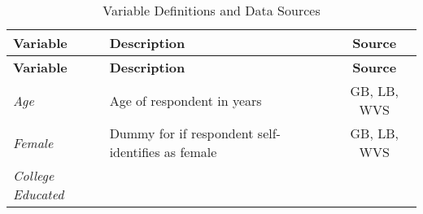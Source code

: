 \documentclass[11pt,]{article}
\begin{document}
\begin{longtable}[]{@{}llc@{}}
\caption{Variable Definitions and Data Sources}\tabularnewline
\toprule
\begin{minipage}[b]{0.19\columnwidth}\raggedright\strut
\textbf{Variable}\strut
\end{minipage} & \begin{minipage}[b]{0.46\columnwidth}\raggedright\strut
\textbf{Description}\strut
\end{minipage} & \begin{minipage}[b]{0.22\columnwidth}\centering\strut
\textbf{Source}\strut
\end{minipage}\tabularnewline
\midrule
\endfirsthead
\toprule
\begin{minipage}[b]{0.19\columnwidth}\raggedright\strut
\textbf{Variable}\strut
\end{minipage} & \begin{minipage}[b]{0.46\columnwidth}\raggedright\strut
\textbf{Description}\strut
\end{minipage} & \begin{minipage}[b]{0.22\columnwidth}\centering\strut
\textbf{Source}\strut
\end{minipage}\tabularnewline
\midrule
\endhead
\begin{minipage}[t]{0.19\columnwidth}\raggedright\strut
\emph{Age}\strut
\end{minipage} & \begin{minipage}[t]{0.46\columnwidth}\raggedright\strut
Age of respondent in years\strut
\end{minipage} & \begin{minipage}[t]{0.22\columnwidth}\centering\strut
GB, LB, WVS\strut
\end{minipage}\tabularnewline
\begin{minipage}[t]{0.19\columnwidth}\raggedright\strut
\emph{Female}\strut
\end{minipage} & \begin{minipage}[t]{0.46\columnwidth}\raggedright\strut
Dummy for if respondent self-identifies as female\strut
\end{minipage} & \begin{minipage}[t]{0.22\columnwidth}\centering\strut
GB, LB, WVS\strut
\end{minipage}\tabularnewline
\begin{minipage}[t]{0.19\columnwidth}\raggedright\strut
\emph{College Educated}\strut
\end{minipage} & \begin{minipage}[t]{0.46\columnwidth}\raggedright\strut

\end{minipage}
\end{longtable}
\end{document}

